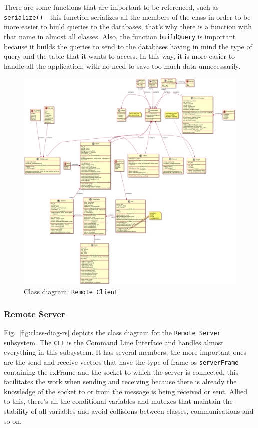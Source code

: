 There are some functions that are important to be referenced, such as \texttt{serialize()} - this function serializes all the members of the class in order to be more easier to build queries to the databases, that's why there is a function with that name in almost all classes.
Also, the function \texttt{buildQuery} is important because it builds the queries to send to the databases having in mind the type of query and the table that it wants to access. In this way, it is more easier to handle all the application, with no need to save too much data unnecessarily.  
%
\begin{figure}[htb!]
\centering
    \includegraphics[width=1.0\columnwidth]{./img/class-diag-rc-hugo.png}
  \caption{Class diagram: \texttt{Remote Client}}%
\label{fig:class-diag-rc}
\end{figure}

\subsubsection{Remote Server}
\label{sec:remote-server-class}
%
Fig.~\ref{fig:class-diag-rs} depicts the class diagram for the \texttt{Remote Server} subsystem.
The \texttt{CLI} is the Command Line Interface and handles almost everything in this subsystem. It has several members, the more important ones are the send and receive vectors that have the type of frame os \texttt{serverFrame} containing the rxFrame and the socket to which the server is connected, this facilitates the work when sending and receiving because there is already the knowledge of the socket to or from the message is being received or sent. Allied to this, there's all the conditional variables and mutexes that maintain the stability of all variables and avoid collisions between classes, communications and so on.

